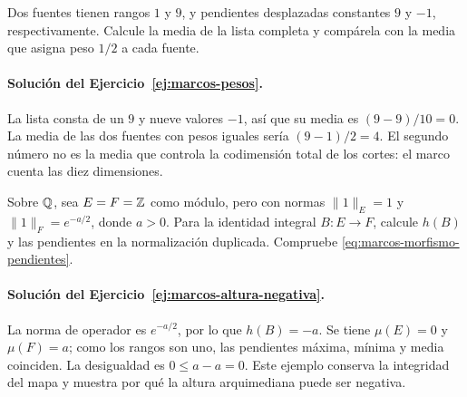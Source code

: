 \begin{ejercicio}\label{ej:marcos-pesos}
Dos fuentes tienen rangos $1$ y $9$, y pendientes desplazadas
constantes $9$ y $-1$, respectivamente. Calcule la media de la lista
completa y compárela con la media que asigna peso $1/2$ a cada fuente.
\end{ejercicio}

\paragraph{Solución del Ejercicio~\ref{ej:marcos-pesos}.}
La lista consta de un $9$ y nueve valores $-1$, así que su media es
$(9-9)/10=0$. La media de las dos fuentes con pesos iguales sería
$(9-1)/2=4$. El segundo número no es la media que controla la
codimensión total de los cortes: el marco cuenta las diez dimensiones.

\begin{ejercicio}\label{ej:marcos-altura-negativa}
Sobre $\mathbb{Q}$, sea $E=F=\mathbb{Z}$ como módulo, pero con normas
$\|1\|_E=1$ y $\|1\|_F=e^{-a/2}$, donde $a>0$.
Para la identidad integral $B:E\to F$, calcule $h(B)$ y las
pendientes en la normalización duplicada. Compruebe
\eqref{eq:marcos-morfismo-pendientes}.
\end{ejercicio}

\paragraph{Solución del Ejercicio~\ref{ej:marcos-altura-negativa}.}
La norma de operador es $e^{-a/2}$, por lo que $h(B)=-a$.
Se tiene $\mu(E)=0$ y $\mu(F)=a$; como los rangos son uno,
las pendientes máxima, mínima y media coinciden. La desigualdad
es $0\le a-a=0$. Este ejemplo conserva la integridad del mapa
y muestra por qué la altura arquimediana puede ser negativa.
